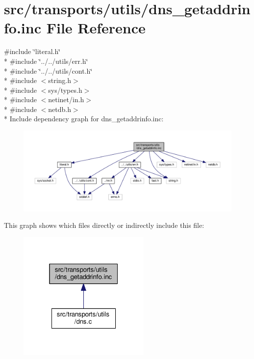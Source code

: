 \hypertarget{dns__getaddrinfo_8inc}{}\section{src/transports/utils/dns\+\_\+getaddrinfo.inc File Reference}
\label{dns__getaddrinfo_8inc}
{\ttfamily \#include \char`\"{}literal.\+h\char`\"{}}\\*
{\ttfamily \#include \char`\"{}../../utils/err.\+h\char`\"{}}\\*
{\ttfamily \#include \char`\"{}../../utils/cont.\+h\char`\"{}}\\*
{\ttfamily \#include $<$string.\+h$>$}\\*
{\ttfamily \#include $<$sys/types.\+h$>$}\\*
{\ttfamily \#include $<$netinet/in.\+h$>$}\\*
{\ttfamily \#include $<$netdb.\+h$>$}\\*
Include dependency graph for dns\+\_\+getaddrinfo.\+inc\+:\nopagebreak
\begin{figure}[H]
\begin{center}
\leavevmode
\includegraphics[width=350pt]{dns__getaddrinfo_8inc__incl}
\end{center}
\end{figure}
This graph shows which files directly or indirectly include this file\+:\nopagebreak
\begin{figure}[H]
\begin{center}
\leavevmode
\includegraphics[width=184pt]{dns__getaddrinfo_8inc__dep__incl}
\end{center}
\end{figure}
